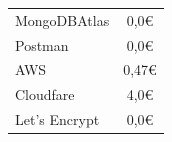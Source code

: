 \begin{table}[H]
\begin{tabular}{lc}
\\
MongoDBAtlas                                                                                               & 0,0€

\\
Postman                                                                                               & 0,0€  

\\
AWS                                                                                               & 0,47€ 

\\
Cloudfare                                                                                               & 4,0€  

\\
Let's Encrypt                                                                                               & 0,0€  


\end{tabular}
\end{table}
